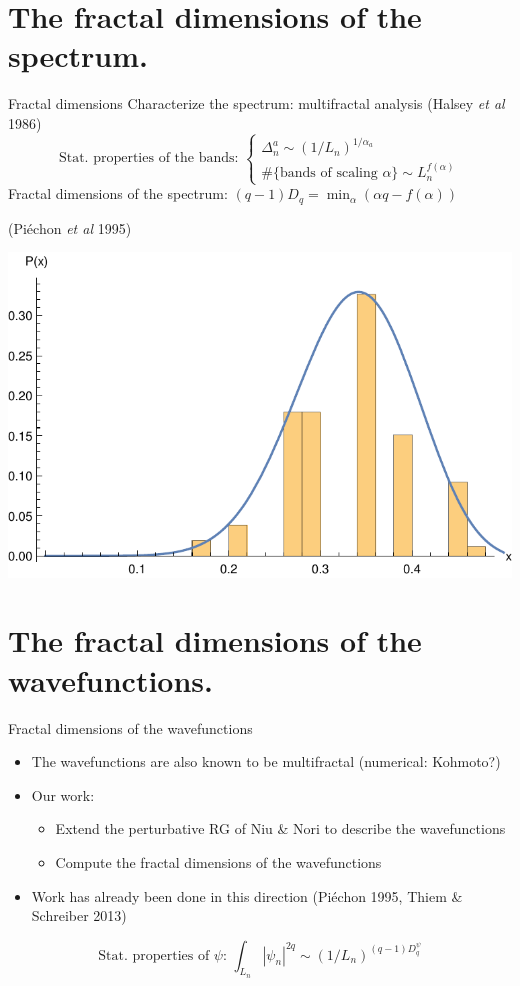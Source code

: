 \documentclass[xcolor=x11names,compress,professionalfonts]{beamer}
\renewcommand{\(}{\begin{columns}}
\renewcommand{\)}{\end{columns}}
\newcommand{\<}[1]{\begin{column}{#1}}
\renewcommand{\>}{\end{column}}
\begin{document}
\section{The fractal dimensions of the spectrum.}
\begin{frame}{Fractal dimensions}
	Characterize the spectrum: multifractal analysis (Halsey \emph{et al} 1986)
	\[
	\text{Stat. properties of the bands:~} 
	\begin{cases}
	\Delta_n^a \sim (1/L_n)^{1/\alpha_a} \\
	\#\{\text{bands of scaling~} \alpha \} \sim L_n^{f(\alpha)} 
	\end{cases}
	\]
	Fractal dimensions of the spectrum: $(q-1)D_q = \min_\alpha(\alpha q - f(\alpha))$
	\begin{flushright}
	(Piéchon \emph{et al} 1995)
	\end{flushright}
	\centering
	\includegraphics[scale=.45]{x_stat_th_comp.pdf}
\end{frame}

\section{The fractal dimensions of the wavefunctions.}
\begin{frame}{Fractal dimensions of the wavefunctions}
\begin{itemize}
	\item The wavefunctions are also known to be multifractal (numerical: Kohmoto?)
	\item Our work:
	\begin{itemize}
		\item Extend the perturbative RG of Niu \& Nori to describe the wavefunctions
		\item Compute the fractal dimensions of the wavefunctions
	\end{itemize}
	\item Work has already been done in this direction (Piéchon 1995, Thiem \& Schreiber 2013)
\end{itemize}
	\[
	\text{Stat. properties of $\psi$:~} 
	\int_{L_n} |\psi_n|^{2q} \sim (1/L_n)^{(q-1)D_q^\psi} 
	\]
\end{frame}
\end{document}
